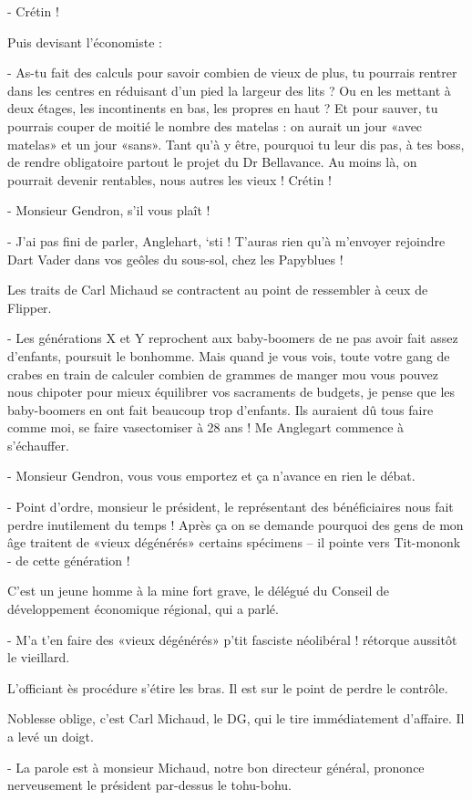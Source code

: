 - Crétin !

Puis devisant l’économiste :

- As-tu fait des calculs pour savoir combien de vieux de plus, tu pourrais rentrer dans les centres en réduisant d’un pied la largeur des lits ? Ou en les mettant à deux étages, les incontinents en bas, les propres en haut ? Et pour sauver, tu pourrais couper de moitié le nombre des matelas : on aurait un jour «avec matelas» et un jour «sans». Tant qu’à y être, pourquoi tu leur dis pas, à tes boss, de rendre obligatoire partout le projet du Dr Bellavance. Au moins là, on pourrait devenir rentables, nous autres les vieux ! Crétin !

- Monsieur Gendron, s’il vous plaît !

- J’ai pas fini de parler, Anglehart, ‘sti ! T’auras rien qu’à m’envoyer rejoindre Dart Vader dans vos geôles du sous-sol, chez les Papyblues !

Les traits de Carl Michaud se contractent au point de ressembler à ceux de Flipper.

- Les générations X et Y reprochent aux baby-boomers de ne pas avoir fait assez d’enfants, poursuit le bonhomme. Mais quand je vous vois, toute votre gang de crabes en train de calculer combien de grammes de manger mou vous pouvez nous chipoter pour mieux équilibrer vos sacraments de budgets, je pense que les baby-boomers en ont fait beaucoup trop d’enfants. Ils auraient dû tous faire comme moi, se faire vasectomiser à 28 ans !
Me Anglegart commence à s’échauffer.

- Monsieur Gendron, vous vous emportez et ça n’avance en rien le débat.

- Point d’ordre, monsieur le président, le représentant des bénéficiaires nous fait perdre inutilement du temps ! Après ça on se demande pourquoi des gens de mon âge traitent de «vieux dégénérés» certains spécimens – il pointe vers Tit-mononk - de cette génération !

C’est un jeune homme à la mine fort grave, le délégué du Conseil de développement économique régional, qui a parlé.

- M’a t’en faire des «vieux dégénérés» p’tit fasciste néolibéral ! rétorque aussitôt le vieillard.

L’officiant ès procédure s’étire les bras. Il est sur le point de perdre le contrôle.

Noblesse oblige, c’est Carl Michaud, le DG, qui le tire immédiatement d’affaire. Il a levé un doigt.

- La parole est à monsieur Michaud, notre bon directeur général, prononce nerveusement le président par-dessus le tohu-bohu.

